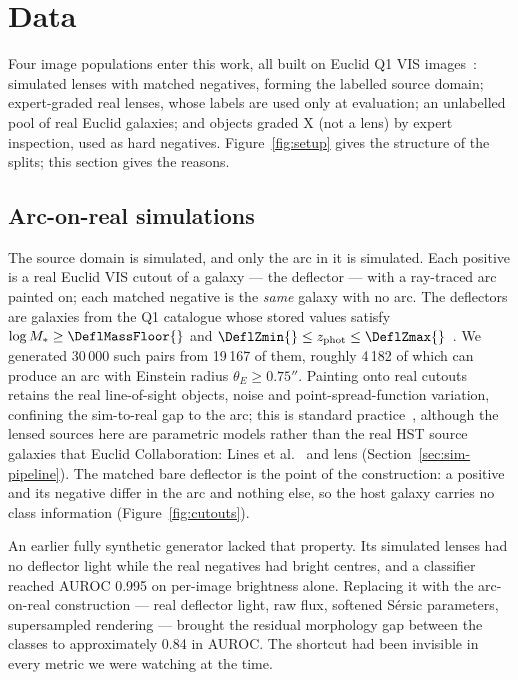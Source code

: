 \section{Data}
\label{sec:data}

Four image populations enter this work, all built on Euclid Q1 VIS
images~\citep{euclidq1overview, euclidq1data}: simulated lenses with matched negatives, forming
the labelled source domain; expert-graded real lenses, whose labels are used only at
evaluation; an unlabelled pool of real Euclid galaxies; and objects graded X (not a lens) by expert
inspection, used as hard negatives. Figure~\ref{fig:setup} gives the structure of the splits; this section
gives the reasons.

\subsection{Arc-on-real simulations}

The source domain is simulated, and only the arc in it is simulated. Each positive is a
real Euclid VIS cutout of a galaxy --- the deflector --- with a ray-traced arc
painted on; each matched negative is the \emph{same} galaxy with no arc. The deflectors are
galaxies from the Q1 catalogue whose stored values satisfy $\log M_* \geq \DeflMassFloor{}$
and $\DeflZmin{} \leq z_{\rm phot} \leq \DeflZmax{}$~\citep{euclidq1phz}. We generated
30\,000 such pairs from 19\,167 of them, roughly 4\,182 of which can
produce an arc with Einstein radius $\theta_E \ge 0.75''$. Painting onto real cutouts
retains the real line-of-sight objects, noise and point-spread-function variation,
confining the sim-to-real gap to the arc; this is standard
practice~\citep{holismokesXI, lines2025discoveryengineC, unions2025}, although the lensed
sources here are parametric models rather than the real HST source galaxies that
Euclid Collaboration: Lines et al.~\citep{lines2025discoveryengineC} and \citet{unions2025} lens
(Section~\ref{sec:sim-pipeline}). The matched bare deflector is
the point of the construction: a positive and its negative differ in the arc and nothing
else, so the host galaxy carries no class information (Figure~\ref{fig:cutouts}).

An earlier fully synthetic generator lacked that property. Its simulated lenses had no
deflector light while the real negatives had bright centres, and a classifier reached
AUROC 0.995 on per-image brightness alone. Replacing it with the arc-on-real construction
--- real deflector light, raw flux, softened S\'ersic parameters, supersampled rendering
--- brought the residual morphology gap between the classes to approximately 0.84 in
AUROC. The shortcut had been invisible in every metric we were watching at the time.

